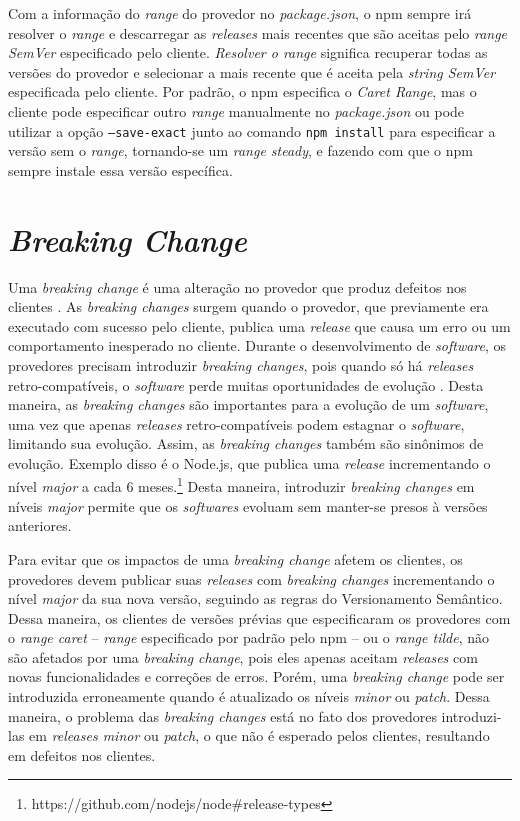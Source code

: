 Com a informação do \textit{range} do provedor no \textit{package.json}, o \textsf{npm} sempre irá resolver o \textit{range} e descarregar as \textit{releases} mais recentes que são aceitas pelo \textit{range SemVer} especificado pelo cliente. \textit{Resolver o range} significa recuperar todas as versões do provedor e selecionar a mais recente que é aceita pela \textit{string SemVer} especificada pelo cliente. Por padrão, o \textsf{npm} especifica o \textit{Caret Range}, mas o cliente pode especificar outro \textit{range} manualmente no \textit{package.json} ou pode utilizar a opção \texttt{--save-exact} junto ao comando \texttt{npm install} para especificar a versão sem o \textit{range}, tornando-se um \textit{range steady}, e fazendo com que o \textsf{npm} sempre instale essa versão específica.

\section{\textit{Breaking Change}}
\label{ref-teo:breaking_change}
Uma \textit{breaking change} é uma alteração no provedor que produz defeitos nos clientes \cite{teorical_reference:semver}. As \textit{breaking changes} surgem quando o provedor, que previamente era executado com sucesso pelo cliente, publica uma \textit{release} que causa um erro ou um comportamento inesperado no cliente. Durante o desenvolvimento de \textit{software}, os provedores precisam introduzir \textit{breaking changes}, pois quando só há \textit{releases} retro-compatíveis, o \textit{software} perde muitas oportunidades de evolução \cite{teorical_reference:bc_2}. Desta maneira, as \textit{breaking changes} são importantes para a evolução de um \textit{software}, uma vez que apenas \textit{releases} retro-compatíveis podem estagnar o \textit{software}, limitando sua evolução. Assim, as \textit{breaking changes} também são sinônimos de evolução. Exemplo disso é o \textsf{Node.js}, que publica uma \textit{release} incrementando o nível \textit{major} a cada 6 meses.\footnote{https://github.com/nodejs/node\#release-types} Desta maneira, introduzir \textit{breaking changes} em níveis \textit{major} permite que os \textit{softwares} evoluam sem manter-se presos à versões anteriores.

Para evitar que os impactos de uma \textit{breaking change} afetem os clientes, os provedores devem publicar suas \textit{releases} com \textit{breaking changes} incrementando o nível \textit{major} da sua nova versão, seguindo as regras do Versionamento Semântico. Dessa maneira, os clientes de versões prévias que especificaram os provedores com o \textit{range caret} -- \textit{range} especificado por padrão pelo \textsf{npm} -- ou o \textit{range tilde}, não são afetados por uma \textit{breaking change}, pois eles apenas aceitam \textit{releases} com novas funcionalidades e correções de erros. Porém, uma \textit{breaking change} pode ser introduzida erroneamente quando é atualizado os níveis \textit{minor} ou \textit{patch}. Dessa maneira, o problema das \textit{breaking changes} está no fato dos provedores introduzi-las em \textit{releases minor} ou \textit{patch}, o que não é esperado pelos clientes, resultando em defeitos nos clientes.

